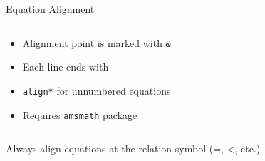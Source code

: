 \begin{frame}[fragile]{Equation Alignment}
\begin{columns}
\begin{column}{0.5\textwidth}
            \begin{itemize}
                \item Alignment point is marked with \texttt{\&}
                \item Each line ends with \texttt{\\}
                \item \texttt{align*} for unnumbered equations
                \item Requires \texttt{amsmath} package
            \end{itemize}
        \end{column}
    \end{columns}
    
    \begin{tip}
        Always align equations at the relation symbol (=, <, etc.)
    \end{tip}
\end{frame}


